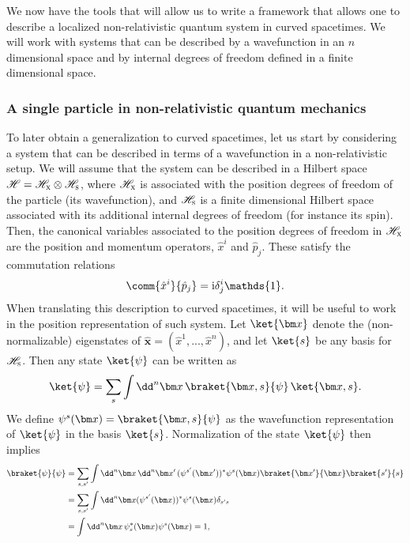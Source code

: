 \documentclass[letterpaper,12pt,titlepage,oneside,final]{book}
\newcommand{\openone}{\mathds{1}}
\newcommand{\ii}{\mathrm{i}}
\begin{document}
We now have the tools that will allow us to write a framework that allows one to describe a localized non-relativistic quantum system in curved spacetimes. We will work with systems that can be described by a wavefunction in an $n$ dimensional space and by internal degrees of freedom defined in a finite dimensional space.


\subsubsection*{A single particle in non-relativistic quantum mechanics}\label{sub:nonrel}

To later obtain a generalization to curved spacetimes, let us start by considering a system that can be described in terms of a wavefunction in a non-relativistic setup. We will assume that the system can be described in a Hilbert space {$\mathscr{H} = \mathscr{H}_\textsc{x}\otimes\mathscr{H}_\textsc{s}$}, where $\mathscr{H}_\textsc{x}$ is associated with the position degrees of freedom of the particle (its wavefunction), and $\mathscr{H}_\textsc{s}$ is a finite dimensional Hilbert space associated with its additional internal degrees of freedom (for instance its spin). Then, the canonical variables associated to the position degrees of freedom in $\mathscr{H}_\textsc{x}$ are the position and momentum operators, $\hat{x}^i$ and $\hat{p}_j$. These satisfy the commutation relations
\begin{equation}\label{eq:xpcomm}
    \comm{\hat{x}^i}{\hat{p}_j} = \ii \delta^i_j\openone.
\end{equation}
When translating this description to curved spacetimes, it will be useful to work in the position representation of such system. Let $\ket{\bm x}$ denote the (non-normalizable) eigenstates of $\hat{\bm x} = (\hat{x}^1,...,\hat{x}^n)$, and let $\ket{s}$ be any basis for $\mathscr{H}_\textsc{s}$. Then any state $\ket{\psi}$ can be written as
\begin{equation}
    \ket{\psi} = \sum_s \int \dd^{n} \bm x\, \braket{\bm x,s}{\psi}\,\ket{\bm x,s}.
\end{equation}
We define $\psi^s(\bm x) = \braket{\bm x,s}{\psi}$ as the wavefunction representation of $\ket{\psi}$ in the basis $\ket{s}$. Normalization of the state $\ket{\psi}$ then implies
\begin{align}
    \braket{\psi}{\psi} &= \sum_{s,s'} \int \dd^n \bm x\,\dd^n \bm x' \,(\psi^{s'}(\bm x'))^*\psi^s(\bm x) \braket{\bm x'}{\bm x}\braket{s'}{s}\nonumber\\
    &= \sum_{s,s'} \int \dd^n \bm x(\psi^{s'}(\bm x))^*\psi^s(\bm x) \delta_{s's}\nonumber\\
    &= \int \dd^n \bm x \,\psi_s^*(\bm x) \psi^s(\bm x)=1,
\end{align}
\end{document}
